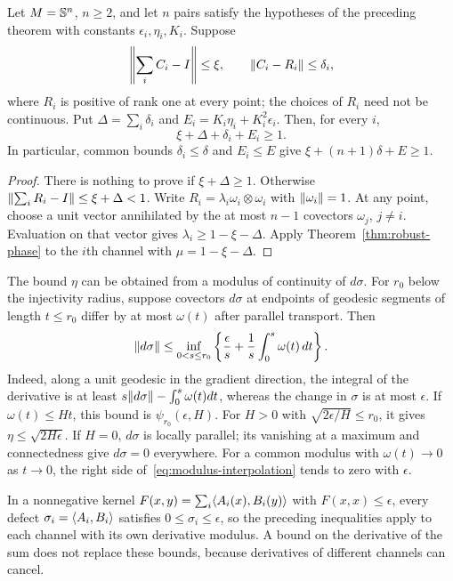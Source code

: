 \begin{corollary}
\label{cor:saturated-phase}
Let $M=\mathbb S^n$, $n\geq2$, and let $n$ pairs satisfy the hypotheses of
the preceding theorem with constants $\epsilon_i,\eta_i,K_i$. Suppose
\[
 \left\|\sum_iC_i-I\right\|\leq\xi,\qquad
 \lVert C_i-R_i\rVert\leq\delta_i,
\]
where $R_i$ is positive of rank one at every point; the choices of
$R_i$ need not be continuous. Put $\Delta=\sum_i\delta_i$ and
$E_i=K_i\eta_i+K_i^2\epsilon_i$. Then, for every $i$,
\[
 \xi+\Delta+\delta_i+E_i\geq1.
\]
In particular, common bounds $\delta_i\leq\delta$ and $E_i\leq E$ give
$\xi+(n+1)\delta+E\geq1$.
\end{corollary}
\begin{proof}
There is nothing to prove if $\xi+\Delta\geq1$. Otherwise
$\lVert \sum_iR_i-I\rVert\leq\xi+\Delta<1$. Write
$R_i=\lambda_i\omega_i\otimes\omega_i$ with $\lVert \omega_i\rVert=1$.
At any point, choose a unit vector annihilated by the at most $n-1$
covectors $\omega_j$, $j\ne i$. Evaluation on that vector gives
$\lambda_i\geq1-\xi-\Delta$. Apply Theorem~\ref{thm:robust-phase}
to the $i$th channel with $\mu=1-\xi-\Delta$.
\end{proof}

The bound $\eta$ can be obtained from a modulus of continuity of
$d\sigma$. For $r_0$ below the injectivity radius, suppose covectors $d\sigma$
at endpoints of geodesic segments of length $t\leq r_0$ differ by
at most $\omega(t)$ after parallel transport. Then
\begin{equation}\label{eq:modulus-interpolation}
 \lVert d\sigma\rVert\leq
 \inf_{0<s\leq r_0}
 \left\{\frac{\epsilon}{s}+
              \frac1s\int_0^s\omega(t)\,dt\right\}.
\end{equation}
Indeed, along a unit geodesic in the gradient direction, the integral
of the derivative is at least $s\lVert d\sigma\rVert-\int_0^s\omega(t)dt$,
whereas the change in $\sigma$ is at most $\epsilon$.
If $\omega(t)\leq Ht$, this bound is $\psi_{r_0}(\epsilon,H)$.
For $H>0$ with $\sqrt{2\epsilon/H}\leq r_0$, it gives
$\eta\leq\sqrt{2H\epsilon}$. If $H=0$, $d\sigma$ is locally parallel;
its vanishing at a maximum and connectedness give $d\sigma=0$
everywhere. For a common modulus with $\omega(t)\to0$ as $t\to0$, the
right side of~\eqref{eq:modulus-interpolation} tends to
zero with $\epsilon$.

In a nonnegative kernel $F(x,y)=\sum_i\langle A_i(x),B_i(y)\rangle$ with
$F(x,x)\leq\epsilon$, every defect $\sigma_i=\langle A_i,B_i\rangle$ satisfies
$0\leq\sigma_i\leq\epsilon$, so the preceding inequalities apply to
each channel with its own derivative modulus. A bound on the derivative of the sum does not replace
these bounds, because derivatives of different channels can cancel.

